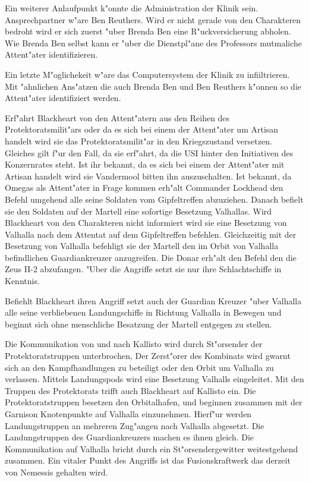  Ein weiterer Anlaufpunkt k"onnte die Administration der Klinik sein. Ansprechpartner w"are Ben Reuthers. Wird er nicht gerade von den Charakteren bedroht wird er sich zuerst "uber Brenda Ben eine R"uckversicherung abholen. Wie Brenda Ben selbst kann er "uber die Dienstpl"ane des Professors mutma\3liche Attent"ater identifizieren.

 Ein letzte M"oglichekeit w"are das Computersystem der Klinik zu infiiltrieren. Mit "ahnlichen Ans"atzen die auch Brenda Ben und Ben Reuthers k"onnen so die Attent"ater identifiziert werden.



Erf"ahrt Blackheart von den Attent"atern aus den Reihen des Protektoratsmilit"ars oder da\3 es sich bei einem der Attent"ater um Artisan handelt wird sie das Protektoratsmilit"ar in den Kriegszustand versetzen. Gleiches gilt f"ur den Fall, da\3 sie erf"ahrt, da\3 die USI hinter den Initiativen des Konzernrates steht. Ist ihr bekannt, da\3 es sich bei einem der Attent"ater mit Artisan handelt wird sie Vandermool bitten ihn auszuschalten. Ist bekannt, da\3 Omegas als Attent"ater in Frage kommen erh"alt Commander Lockhead den Befehl umgehend alle seine Soldaten vom Gipfeltreffen abzuziehen. Danach befielt sie den Soldaten auf der Martell eine sofortige Besetzung Valhallas. Wird Blackheart von den Charakteren nicht informiert wird sie eine Besetzung von Valhalla nach dem Attentat auf dem Gipfeltreffen befehlen. Gleichzeitig mit der Besetzung von Valhalla befehligt sie der Martell den im Orbit von Valhalla befindlichen Guardiankreuzer anzugreifen. Die Donar erh"alt den Befehl den die Zeus II-2 abzufangen. "Uber die Angriffe setzt sie nur ihre Schlachtschiffe in Kenntnis.

Befiehlt Blackheart ihren Angriff setzt auch der Guardian Kreuzer "uber Valhalla alle seine verbliebenen Landungschiffe in Richtung Valhalla in Bewegen und beginnt sich ohne menschliche Besatzung der Martell entgegen zu stellen.

Die Kommunikation von und nach Kallisto wird durch St"orsender der Protektoratstruppen unterbrochen, Der Zerst"orer des Kombinats wird gwarnt sich an den Kampfhandlungen zu beteiligt oder den Orbit um Valhalla zu verlassen. Mittels Landungspods wird eine Besetzung Valhalls eingeleitet. Mit den Truppen des Protektorats trifft auch Blackheart auf Kallisto ein. Die Protektoratstruppen besetzen den Orbitalhafen, und beginnen zusammen mit der Garnison  Knotenpunkte auf Valhalla einzunehmen. Hierf"ur werden Landungstruppen an mehreren Zug"angen nach Valhalla abgesetzt. Die Landungstruppen des Guardiankreuzers machen es ihnen gleich. Die Kommunikation auf Valhalla bricht durch ein St"orsendergewitter weitestgehend zusammen. Ein vitaler Punkt des Angriffs ist das Fusionskraftwerk das derzeit von Nemessis gehalten wird.

